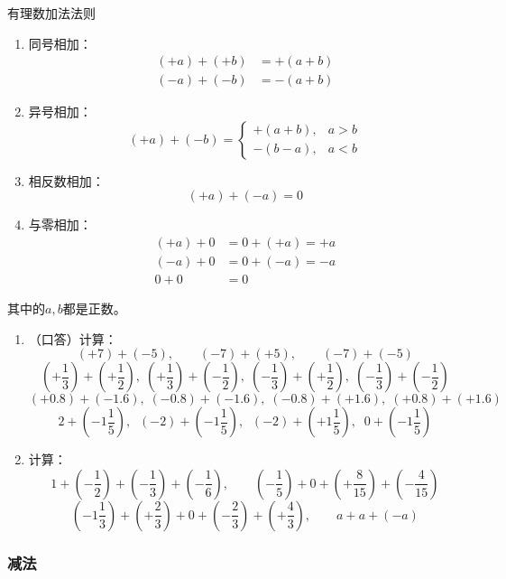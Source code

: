 \begin{blk}{有理数加法法则}
\begin{enumerate}
    \item 同号相加：
    \[\begin{split}
        (+a)+(+b)&=+(a+b)\\
      (-a)+(-b)&=-(a+b)
    \end{split}\]
    \item 异号相加：
    \[(+a)+(-b)=\begin{cases}
        +(a+b),& a>b\\
-(b-a),&a<b
    \end{cases}\]
    \item 相反数相加：
    \[(+a)+(-a)=0\]
    \item 与零相加：
    \[\begin{split}
        (+a)+0&=0+(+a)=+a\\
      (-a)+0&=0+(-a)=-a\\
    0+0&=0
    \end{split}\]
\end{enumerate}    
其中的$a,b$都是正数。
\end{blk}
      
\begin{ex}
\begin{enumerate}
    \item （口答）计算：
\[(+7)+(-5),\qquad (-7)+(+5),\qquad (-7)+(-5) \]
\[\left(+\frac{1}{3}\right)+\left(+\frac{1}{2}\right),\; \left(+\frac{1}{3}\right)+\left(-\frac{1}{2}\right),\; \left(-\frac{1}{3}\right)+\left(+\frac{1}{2}\right) ,\; \left(-\frac{1}{3}\right)+\left(-\frac{1}{2}\right) \]
\[(+0.8)+(-1.6),\; (-0.8)+(-1.6),\; (-0.8)+(+1.6),\; (+0.8)+(+1.6) \]
\[2+\left(-1\frac{1}{5}\right),\;\;(-2)+\left(-1\frac{1}{5}\right),\;\;(-2)+\left(+1\frac{1}{5}\right),\;\; 0+\left(-1\frac{1}{5}\right)\]
\item 计算：
\[1+\left(-\frac{1}{2}\right)+\left(-\frac{1}{3}\right)+\left(-\frac{1}{6}\right),\qquad \left(-\frac{1}{5}\right)+0+\left(+\frac{8}{15}\right)+\left(-\frac{4}{15}\right) \]
\[\left(-1\frac{1}{3}\right)+\left(+\frac{2}{3}\right)+0+\left(-\frac{2}{3}\right)+\left(+\frac{4}{3}\right),\qquad a+a+(-a) \]
\end{enumerate}
\end{ex}

\subsubsection{减法}

